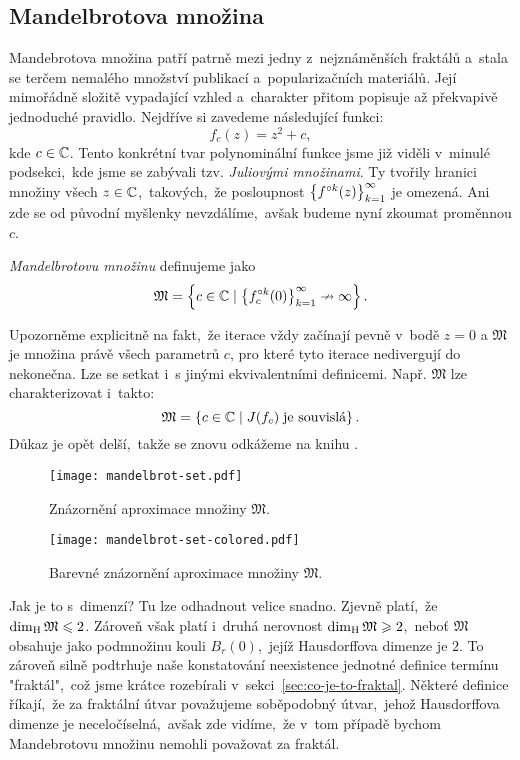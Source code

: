 \subsection{Mandelbrotova množina}\label{subsec:mandebrotova-mnozina}

Mandebrotova množina patří patrně mezi jedny z~nejznáměnších fraktálů a~stala se terčem nemalého množství publikací a~popularizačních materiálů. Její mimořádně složitě vypadající vzhled a~charakter přitom popisuje až překvapivě jednoduché pravidlo. Nejdříve si zavedeme následující funkci:
\[f_c(z)=z^2+c,\]
kde $c\in\mathbb{C}$. Tento konkrétní tvar polynominální funkce jsme již viděli v~minulé podsekci,~kde jsme se zabývali tzv. \emph{Juliovými množinami}. Ty tvořily hranici množiny všech $z\in\mathbb{C}$,~takových,~že posloupnost $\left\{f^{\circ k}(z)\right\}_{k=1}^\infty$ je omezená. Ani zde se od původní myšlenky nevzdálíme,~avšak budeme nyní zkoumat proměnnou $c$.
\begin{definition}\label{def:mandebrotova-mnozina}
    \emph{Mandelbrotovu množinu} definujeme jako
    \[\mathfrak{M}=\left\{c\in\mathbb{C}\mid \left\{f_c^{\circ k}(0)\right\}_{k=1}^\infty\nrightarrow\infty\right\}.\]
\end{definition}
Upozorněme explicitně na fakt,~že iterace vždy začínají pevně v~bodě $z=0$ a $\mathfrak{M}$ je množina právě všech parametrů $c$, pro které tyto iterace nedivergují do nekonečna. Lze se setkat i~s jinými ekvivalentními definicemi. Např. $\mathfrak{M}$ lze charakterizovat i~takto:
\[\mathfrak{M}=\left\{c\in\mathbb{C}\mid J(f_c)\;\text{je souvislá}\right\}.\]
Důkaz je opět delší,~takže se znovu odkážeme na knihu \citep[str. 245]{Falconer1989}.
\begin{figure}[h]
    \centering
    \texttt{[image: mandelbrot-set.pdf]}
    \caption{Znázornění aproximace množiny $\mathfrak{M}$.}
    \label{fig:znazorneni-mandebrotovy-mnoziny}
\end{figure}
\begin{figure}[h]
    \centering
    \texttt{[image: mandelbrot-set-colored.pdf]}
    \caption{Barevné znázornění aproximace množiny $\mathfrak{M}$.}
    \label{fig:znazorneni-mandebrotovy-mnoziny-vybarveno}
\end{figure}
Jak je to s~dimenzí? Tu lze odhadnout velice snadno. Zjevně platí,~že $\operatorname{dim_H}{\mathfrak{M}}\leqslant 2$. Zároveň však platí i~druhá nerovnost $\operatorname{dim_H}{\mathfrak{M}}\geqslant 2$,~neboť $\mathfrak{M}$ obsahuje jako podmnožinu kouli $B_r(0)$,~jejíž Hausdorffova dimenze je $2$. To zároveň silně podtrhuje naše konstatování neexistence jednotné definice termínu "fraktál",~což jsme krátce rozebírali v~sekci~\ref{sec:co-je-to-fraktal}. Některé definice říkají,~že za fraktální útvar považujeme soběpodobný útvar,~jehož Hausdorffova dimenze je neceločíselná,~avšak zde vidíme,~že v~tom případě bychom Mandebrotovu množinu nemohli považovat za fraktál.